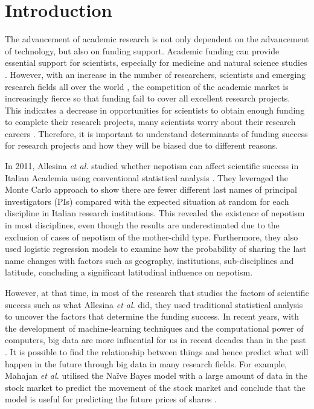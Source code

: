 \section{Introduction}

The advancement of academic research is not only dependent on the advancement of technology, but also on funding support. Academic funding can provide essential support for scientists, especially for medicine and natural science studies \cite{Magua2017}. However, with an increase in the number of researchers, scientists and emerging research fields all over the world \cite{david2014}, the competition of the academic market is increasingly fierce so that funding fail to cover all excellent research projects. This indicates a decrease in opportunities for scientists to obtain enough funding to complete their research projects, many scientists worry about their research careers \cite{Acuna2012}. Therefore, it is important to understand determinants of funding success for research projects and how they will be biased due to different reasons.

In 2011, Allesina \textit{et al.} studied whether nepotism can affect scientific success in Italian Academia using conventional statistical analysis \cite{allesina2011}. They leveraged the Monte Carlo approach to show there are fewer different last names of principal investigators (PIs) compared with the expected situation at random for each discipline in Italian research institutions. This revealed the existence of nepotism in most disciplines, even though the results are underestimated due to the exclusion of cases of nepotism of the mother-child type. Furthermore, they also used logistic regression models to examine how the probability of sharing the last name changes with factors such as geography, institutions, sub-disciplines and latitude, concluding a significant latitudinal influence on nepotism.

However, at that time, in most of the research that studies the factors of scientific success such as what Allesina \textit{et al.} did, they used traditional statistical analysis to uncover the factors that determine the funding success. In recent years, with the development of machine-learning techniques and the computational power of computers, big data are more influential for us in recent decades than in the past \cite{hilbert2016}. It is possible to find the relationship between things and hence predict what will happen in the future through big data in many research fields. For example, Mahajan \textit{et al.} utilised the Na{\"i}ve Bayes model with a large amount of data in the stock market to predict the movement of the stock market and conclude that the model is useful for predicting the future prices of shares \cite{Kannan2016StockMP}.


